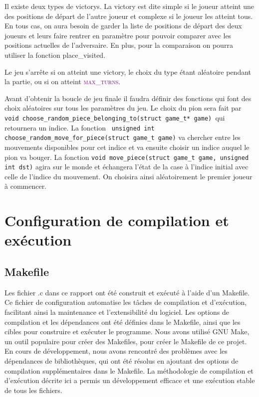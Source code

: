 \documentclass[a4paper]{article}
\begin{document}
Il existe deux types de victorys. La victory est dite simple si le joueur atteint une des positions de départ de l’autre joueur
 et complexe si le joueur les atteint tous. En tous cas, on aura besoin de garder la liste de positions de départ des deux joueurs 
 et leurs faire rentrer en paramètre pour pouvoir comparer avec les positions actuelles de l’adversaire. En plus, pour la comparaison on 
 pourra utiliser la fonction place\_visited. 

Le jeu s’arrête si on atteint une victory, le choix du type étant aléatoire pendant la partie, ou si on atteint \textcolor{purple}{\textsc{max\_turns}}. 

Avant d’obtenir la boucle de jeu finale il faudra définir des fonctions qui font des choix aléatoires sur tous les paramètres du jeu. 
Le choix du pion sera fait par \lstinline|void choose_random_piece_belonging_to(struct game_t* game) |qui retournera un indice. La fonction \lstinline| unsigned int choose_random_move_for_piece(struct game_t game)| va chercher entre les mouvements disponibles pour cet indice et va ensuite choisir un indice auquel le pion va bouger. La fonction \lstinline|void move_piece(struct game_t game, unsigned int dst)| agira sur le monde et échangera l’état de la case à l’indice initial avec celle de l’indice du mouvement. On choisira ainsi aléatoirement le premier joueur à commencer. 



\section{Configuration de compilation et exécution}
\subsection{Makefile}


Les fichier .c  dans ce rapport ont été construit et exécuté à l'aide d'un Makefile. Ce fichier de configuration automatise les tâches de compilation et d'exécution, facilitant ainsi la maintenance et l'extensibilité du logiciel. Les options de compilation et les dépendances ont été définies dans le Makefile, ainsi que les cibles pour construire et exécuter le programme. Nous avons utilisé GNU Make, un outil populaire pour créer des Makefiles, pour créer le Makefile de ce projet. En cours de développement, nous avons rencontré des problèmes avec les dépendances de bibliothèques, qui ont été résolus en ajoutant des options de compilation supplémentaires dans le Makefile. La méthodologie de compilation et d'exécution décrite ici a permis un développement efficace et une exécution stable de tous les fichiers.
\end{document}
